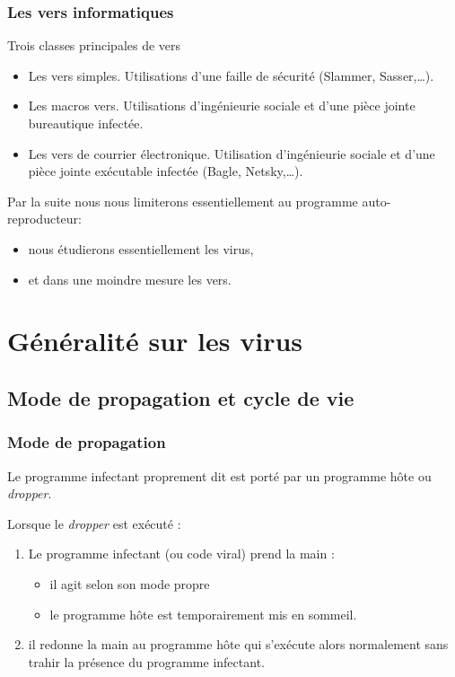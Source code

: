 \documentclass{beamer}
\newcommand{\enlight}[1]{\textit{\color{blue}#1}}
\begin{document}
\begin{frame}
\frametitle{Les vers informatiques}

Trois classes principales de vers
\begin{itemize}
\item {\color{lightblue} Les vers simples.} Utilisations d'une faille de sécurité (Slammer, Sasser,\ldots).
\item {\color{lightblue} Les macros vers.} Utilisations d'ingénieurie sociale et d'une pièce jointe bureautique infectée.
\item {\color{lightblue} Les vers de courrier électronique.} Utilisation d'ingénieurie sociale et d'une pièce jointe exécutable infectée (Bagle, Netsky,\ldots).
\end{itemize}

\end{frame}


\begin{frame}
Par la suite nous nous limiterons essentiellement au programme auto-reproducteur:
\begin{itemize}
\item nous étudierons essentiellement les virus,
\item et dans une moindre mesure les vers.
\end{itemize}
\end{frame}

\section{Généralité sur les virus}

\subsection{Mode de propagation et cycle de vie}

\begin{frame}
\frametitle{Mode de propagation}
  Le programme infectant proprement dit est porté par un programme hôte ou \enlight{dropper}.
  \bigskip
  
  {\color{blue} Lorsque le \enlight{dropper} est exécuté : }
\begin{enumerate}
\item Le programme infectant (ou code viral) prend la main :
  \begin{itemize}
  \item il agit selon son mode propre
  \item le programme hôte est  temporairement mis en sommeil.
  \end{itemize}
  \medskip
  
\item il redonne la main au programme hôte qui s'exécute alors normalement sans trahir la présence du programme infectant.
\end{enumerate}

\end{frame}
\end{document}
